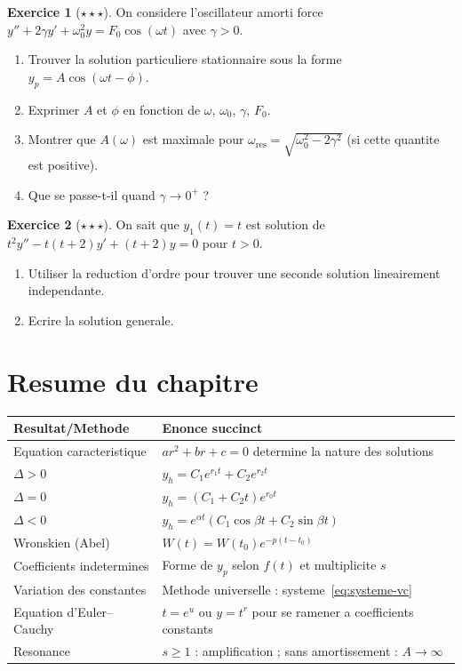 \documentclass[12pt,a4paper,openany]{book}
\theoremstyle{definition}
\newtheorem{exercice}{Exercice}[chapter]
\theoremstyle{plain}
\theoremstyle{remark}
\begin{document}
\begin{exercice}[$\star\star\star$]\label{exo:resonance-amortie}
On considere l'oscillateur amorti force $y'' + 2\gamma y' + \omega_0^2 y = F_0\cos(\omega t)$ avec $\gamma > 0$.
\begin{enumerate}[label=(\alph*)]
  \item Trouver la solution particuliere stationnaire sous la forme $y_p = A\cos(\omega t - \phi)$.
  \item Exprimer $A$ et $\phi$ en fonction de $\omega$, $\omega_0$, $\gamma$, $F_0$.
  \item Montrer que $A(\omega)$ est maximale pour $\omega_{\mathrm{res}} = \sqrt{\omega_0^2 - 2\gamma^2}$ (si cette quantite est positive).
  \item Que se passe-t-il quand $\gamma \to 0^+$ ?
\end{enumerate}
\end{exercice}

\begin{exercice}[$\star\star\star$]\label{exo:reduction-ordre-general}
On sait que $y_1(t) = t$ est solution de $t^2 y'' - t(t+2)y' + (t+2)y = 0$ pour $t > 0$.
\begin{enumerate}[label=(\alph*)]
  \item Utiliser la reduction d'ordre pour trouver une seconde solution lineairement independante.
  \item Ecrire la solution generale.
\end{enumerate}
\end{exercice}

\section*{Resume du chapitre}

\begin{center}
\renewcommand{\arraystretch}{1.5}
\begin{tabular}{@{}p{4.5cm}p{9cm}@{}}
\toprule
\textbf{Resultat/Methode} & \textbf{Enonce succinct} \\
\midrule
Equation caracteristique & $ar^2 + br + c = 0$ determine la nature des solutions \\
$\Delta > 0$ & $y_h = C_1 e^{r_1 t} + C_2 e^{r_2 t}$ \\
$\Delta = 0$ & $y_h = (C_1 + C_2 t)e^{r_0 t}$ \\
$\Delta < 0$ & $y_h = e^{\alpha t}(C_1\cos\beta t + C_2\sin\beta t)$ \\
Wronskien (Abel) & $W(t) = W(t_0)e^{-p(t-t_0)}$ \\
Coefficients indetermines & Forme de $y_p$ selon $f(t)$ et multiplicite $s$ \\
Variation des constantes & Methode universelle : systeme~\eqref{eq:systeme-vc} \\
Equation d'Euler--Cauchy & $t = e^u$ ou $y = t^r$ pour se ramener a coefficients constants \\
Resonance & $s \geq 1$ : amplification ; sans amortissement : $A \to \infty$ \\
\bottomrule
\end{tabular}
\end{center}
\end{document}
